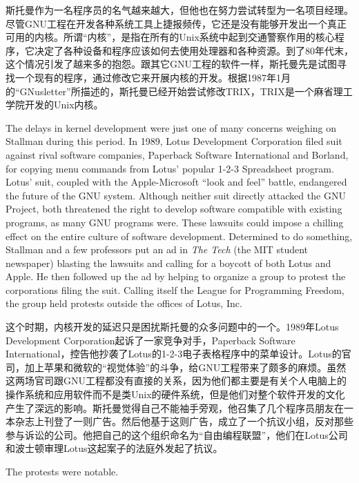 \ifdefined\chs
斯托曼作为一名程序员的名气越来越大，但他也在努力尝试转型为一名项目经理。尽管GNU工程在开发各种系统工具上捷报频传，它还是没有能够开发出一个真正可用的内核。所谓``内核''，是指在所有的Unix系统中起到交通警察作用的核心程序，它决定了各种设备和程序应该如何去使用处理器和各种资源。到了80年代末，这个情况引发了越来多的抱怨。跟其它GNU工程的软件一样，斯托曼先是试图寻找一个现有的程序，通过修改它来开展内核的开发。根据1987年1月的``GNusletter''所描述的，斯托曼已经开始尝试修改TRIX，TRIX是一个麻省理工学院开发的Unix内核。
\fi

\ifdefined\eng
The delays in kernel development were just one of many concerns weighing on Stallman during this period. In 1989, Lotus Development Corporation filed suit against rival software companies, Paperback Software International and Borland, for copying menu commands from Lotus' popular 1-2-3 Spreadsheet program. Lotus' suit, coupled with the Apple-Microsoft ``look and feel'' battle, endangered the future of the GNU system. Although neither suit directly attacked the GNU Project, both threatened the right to develop software compatible with existing programs, as many GNU programs were.  These lawsuits could impose a chilling effect on the entire culture of software development. Determined to do something, Stallman and a few professors put an ad in \textit{The Tech} (the MIT student newspaper) blasting the lawsuits and calling for a boycott of both Lotus and Apple. He then followed up the ad by helping to organize a group to protest the corporations filing the suit. Calling itself the League for Programming Freedom, the group held protests outside the offices of Lotus, Inc.
\fi

\ifdefined\chs
这个时期，内核开发的延迟只是困扰斯托曼的众多问题中的一个。1989年Lotus Development Corporation起诉了一家竞争对手，Paperback Software International，控告他抄袭了Lotus的1-2-3电子表格程序中的菜单设计。Lotus的官司，加上苹果和微软的``视觉体验''的斗争，给GNU工程带来了颇多的麻烦。虽然这两场官司跟GNU工程都没有直接的关系，因为他们都主要是有关个人电脑上的操作系统和应用软件而不是类Unix的硬件系统，但是他们对整个软件开发的文化产生了深远的影响。斯托曼觉得自己不能袖手旁观，他召集了几个程序员朋友在一本杂志上刊登了一则广告。然后他基于这则广告，成立了一个抗议小组，反对那些参与诉讼的公司。他把自己的这个组织命名为``自由编程联盟''，他们在Lotus公司和波士顿审理Lotus这起案子的法庭外发起了抗议。
\fi

\ifdefined\eng
The protests were notable.
\fi

